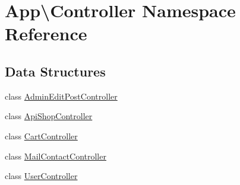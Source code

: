 \hypertarget{namespace_app_1_1_controller}{}\section{App\textbackslash{}Controller Namespace Reference}
\label{namespace_app_1_1_controller}
\subsection*{Data Structures}
\begin{DoxyCompactItemize}
\item 
class \mbox{\hyperlink{class_app_1_1_controller_1_1_admin_edit_post_controller}{Admin\+Edit\+Post\+Controller}}
\item 
class \mbox{\hyperlink{class_app_1_1_controller_1_1_api_shop_controller}{Api\+Shop\+Controller}}
\item 
class \mbox{\hyperlink{class_app_1_1_controller_1_1_cart_controller}{Cart\+Controller}}
\item 
class \mbox{\hyperlink{class_app_1_1_controller_1_1_mail_contact_controller}{Mail\+Contact\+Controller}}
\item 
class \mbox{\hyperlink{class_app_1_1_controller_1_1_user_controller}{User\+Controller}}
\end{DoxyCompactItemize}
